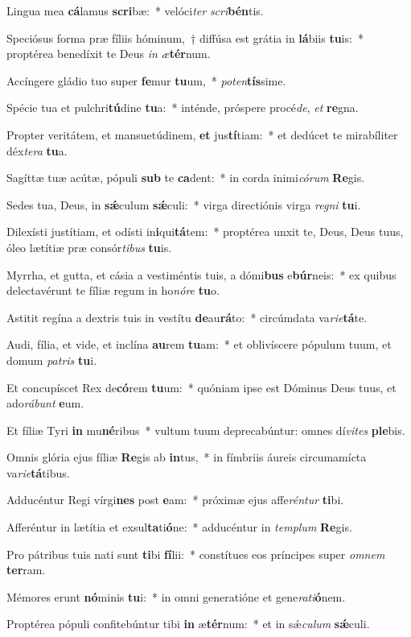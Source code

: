 \item Lingua mea \textbf{cá}lamus \textbf{scri}bæ:~* velóci\textit{ter} \textit{scri}\textbf{bén}tis.
\item Speciósus forma præ fíliis hóminum,~† diffúsa est grátia in \textbf{lá}biis \textbf{tu}is:~* proptérea benedíxit te Deus \textit{in} \textit{æ}\textbf{tér}num.
\item Accíngere gládio tuo super \textbf{fe}mur \textbf{tu}um,~* \textit{pot}\textit{en}\textbf{tís}sime.
\item Spécie tua et pulchri\textbf{tú}dine \textbf{tu}a:~* inténde, próspere procé\textit{de}, \textit{et} \textbf{re}gna.
\item Propter veritátem, et mansuetúdinem, \textbf{et} jus\textbf{tí}tiam:~* et dedúcet te mirabíliter déx\textit{te}\textit{ra} \textbf{tu}a.
\item Sagíttæ tuæ acútæ, pópuli \textbf{sub} te \textbf{ca}dent:~* in corda inimi\textit{có}\textit{rum} \textbf{Re}gis.
\item Sedes tua, Deus, in \textbf{sǽ}culum \textbf{sǽ}culi:~* virga directiónis virga \textit{re}\textit{gni} \textbf{tu}i.
\item Dilexísti justítiam, et odísti in\textbf{i}qui\textbf{tá}tem:~* proptérea unxit te, Deus, Deus tuus, óleo lætítiæ præ consór\textit{ti}\textit{bus} \textbf{tu}is.
\item Myrrha, et gutta, et cásia a vestiméntis tuis, a dómi\textbf{bus} e\textbf{búr}neis:~* ex quibus delectavérunt te fíliæ regum in ho\textit{nó}\textit{re} \textbf{tu}o.
\item Astitit regína a dextris tuis in vestítu \textbf{de}au\textbf{rá}to:~* circúmdata va\textit{ri}\textit{e}\textbf{tá}te.
\item Audi, fília, et vide, et inclína \textbf{au}rem \textbf{tu}am:~* et oblivíscere pópulum tuum, et domum \textit{pa}\textit{tris} \textbf{tu}i.
\item Et concupíscet Rex de\textbf{có}rem \textbf{tu}um:~* quóniam ipse est Dóminus Deus tuus, et ado\textit{rá}\textit{bunt} \textbf{e}um.
\item Et fíliæ Tyri \textbf{in} mu\textbf{né}ribus~* vultum tuum deprecabúntur: omnes dí\textit{vi}\textit{tes} \textbf{ple}bis.
\item Omnis glória ejus fíliæ \textbf{Re}gis ab \textbf{in}tus,~* in fímbriis áureis circumamícta va\textit{ri}\textit{e}\textbf{tá}tibus.
\item Adducéntur Regi vírgi\textbf{nes} post \textbf{e}am:~* próximæ ejus affe\textit{rén}\textit{tur} \textbf{ti}bi.
\item Afferéntur in lætítia et exsul\textbf{ta}ti\textbf{ó}ne:~* adducéntur in \textit{tem}\textit{plum} \textbf{Re}gis.
\item Pro pátribus tuis nati sunt \textbf{ti}bi \textbf{fí}lii:~* constítues eos príncipes super \textit{om}\textit{nem} \textbf{ter}ram.
\item Mémores erunt \textbf{nó}minis \textbf{tu}i:~* in omni generatióne et gene\textit{ra}\textit{ti}\textbf{ó}nem.
\item Proptérea pópuli confitebúntur tibi \textbf{in} æ\textbf{tér}num:~* et in sǽ\textit{cu}\textit{lum} \textbf{sǽ}culi.
